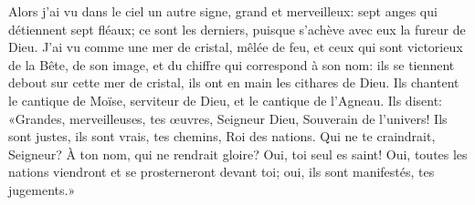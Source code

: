 Alors j’ai vu dans le ciel un autre signe, grand et merveilleux:
	sept anges qui détiennent sept fléaux;
	ce sont les derniers, puisque s’achève avec eux la fureur de Dieu.
J’ai vu comme une mer de cristal, mêlée de feu,
	et ceux qui sont victorieux de la Bête, de son image,
	et du chiffre qui correspond à son nom:
	ils se tiennent debout sur cette mer de cristal,
	ils ont en main les cithares de Dieu.
Ils chantent le cantique de Moïse, serviteur de Dieu,
	et le cantique de l’Agneau.
Ils disent: «Grandes, merveilleuses, tes œuvres,
	Seigneur Dieu, Souverain de l’univers!
	Ils sont justes, ils sont vrais, tes chemins, Roi des nations.
Qui ne te craindrait, Seigneur? À ton nom, qui ne rendrait gloire?
	Oui, toi seul es saint!
Oui, toutes les nations viendront et se prosterneront devant toi;
	oui, ils sont manifestés, tes jugements.»
